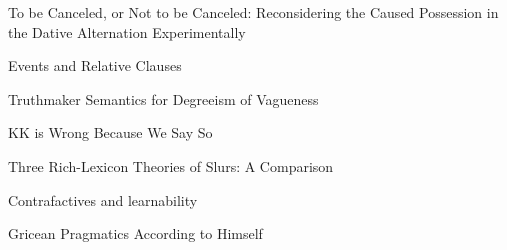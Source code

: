 \documentclass[12pt]{jarticle}
\begin{document}

  
      {To be Canceled, or Not to be Canceled: Reconsidering the Caused Possession in the Dative Alternation Experimentally}
      {}
  
      {Events and Relative Clauses}
      {}
  
      {Truthmaker Semantics for Degreeism of Vagueness}
      {}




  
      {KK is Wrong Because We Say So}
      {}
  
      {Three Rich-Lexicon Theories of Slurs: A Comparison}
      {}
  
      {Contrafactives and learnability}
      {}




  
      {Gricean Pragmatics According to Himself}
      {}






  
\end{document}
